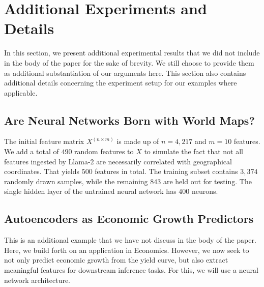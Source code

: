 \documentclass{article}
\theoremstyle{plain}
\theoremstyle{definition}
\theoremstyle{remark}
\begin{document}
\section{Additional Experiments and Details}\label{appendix:autoencoder}

In this section, we present additional experimental results that we did not include in the body of the paper for the sake of brevity. We still choose to provide them as additional substantiation of our arguments here. This section also contains additional details concerning the experiment setup for our examples where applicable. 

\subsection{Are Neural Networks Born with World Maps?}

The initial feature matrix \(X^{(n \times m)}\) is made up of \(n=4,217\) and \(m=10\) features.  We add a total of \(490\) random features to \(X\) to simulate the fact that not all features ingested by Llama-2 are necessarily correlated with geographical coordinates. That yields \(500\) features in total. The training subset contains \(3,374\) randomly drawn samples, while the remaining \(843\) are held out for testing. The single hidden layer of the untrained neural network has \(400\) neurons.

\subsection{Autoencoders as Economic Growth Predictors}\label{example-deep-learning}


This is an additional example that we have not discuss in the body of the paper. Here, we build forth on an application in Economics. However, we now seek to not only predict economic growth from the yield curve, but also extract meaningful features for downstream inference tasks. For this, we will use a neural network architecture.
\end{document}
